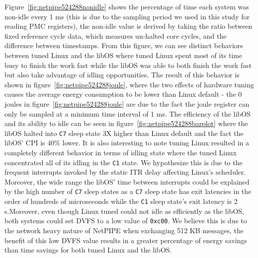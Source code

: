 Figure~\ref{fig:netpipe524288nonidle} shows the percentage of time each system was non-idle every 1 ms (this is due to the sampling period we used in this study for reading PMC registers), the non-idle value is derived by taking the ratio between fixed reference cycle data, which measures un-halted core cycles, and the difference between timestamps. From this figure, we can see distinct behaviors between tuned Linux and the libOS where tuned Linux spent most of its time busy to finish the work fast while the libOS was able to both finish the work fast but also take advantage of idling opportunities. The result of this behavior is shown in figure~\ref{fig:netpipe524288joule}, where the two effects of hardware tuning causes the average energy consumption to be lower than Linux default - the 0 joules in figure~\ref{fig:netpipe524288joule} are due to the fact the joule register can only be sampled at a minimum time interval of 1 ms. The efficiency of the libOS and its ability to idle can be seen in figure~\ref{fig:netpipe524288barplot} where the libOS halted into \texttt{C7} sleep state 3X higher than Linux default and the fact the libOS' CPI is 40\% lower. It is also interesting to note tuning Linux resulted in a completely different behavior in terms of idling state where the tuned Linux concentrated all of its idling in the \texttt{C1} state. We hypothesize this is due to the frequent interrupts invoked by the static ITR delay affecting Linux's scheduler. Moreover, the wide range the libOS' time between interrupts could be explained by the high number of \texttt{C7} sleep states as a \texttt{C7} sleep state has exit latencies in the order of hundreds of microseconds while the \texttt{C1} sleep state's exit latency is 2 \micro s.Moreover, even though Linux tuned could not idle as efficiently as the libOS, both systems could set DVFS to a low value of \texttt{0xc00}. We believe this is due to the network heavy nature of NetPIPE when exchanging 512 KB messages, the benefit of this low DVFS value results in a greater percentage of energy savings than time savings for both tuned Linux and the libOS.



